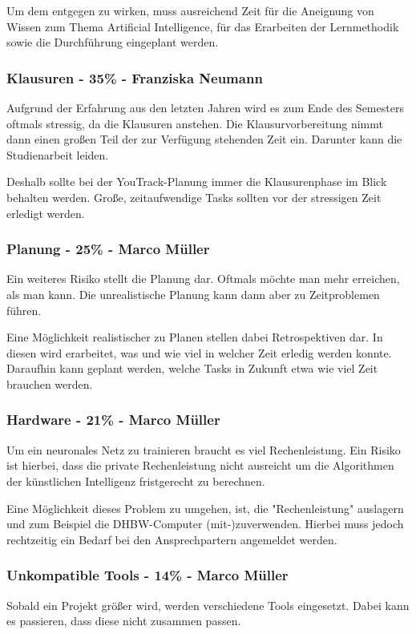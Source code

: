 Um dem entgegen zu wirken, muss ausreichend Zeit für die Aneignung von Wissen zum Thema Artificial Intelligence, für das Erarbeiten der Lernmethodik sowie die Durchführung eingeplant werden.

\subsubsection{Klausuren - 35\% - Franziska Neumann}
Aufgrund der Erfahrung aus den letzten Jahren wird es zum Ende des Semesters oftmals stressig, da die Klausuren anstehen. Die Klausurvorbereitung nimmt dann einen großen Teil der zur Verfügung stehenden Zeit ein. Darunter kann die Studienarbeit leiden.

Deshalb sollte bei der YouTrack-Planung immer die Klausurenphase im Blick behalten werden. Große, zeitaufwendige Tasks sollten vor der stressigen Zeit erledigt werden.

\subsubsection{Planung - 25\% - Marco Müller}
Ein weiteres Risiko stellt die Planung dar. Oftmals möchte man mehr erreichen, als man kann. Die unrealistische Planung kann dann aber zu Zeitproblemen führen. 

Eine Möglichkeit realistischer zu Planen stellen dabei Retrospektiven dar. In diesen wird erarbeitet, was und wie viel in welcher Zeit erledig werden konnte. Daraufhin kann geplant werden, welche Tasks in Zukunft etwa wie viel Zeit brauchen werden.

\subsubsection{Hardware - 21\% - Marco Müller}
Um ein neuronales Netz zu trainieren braucht es viel Rechenleistung. Ein Risiko ist hierbei, dass die private Rechenleistung nicht ausreicht um die Algorithmen der künstlichen Intelligenz fristgerecht zu berechnen. 

Eine Möglichkeit dieses Problem zu umgehen, ist, die "Rechenleistung" auslagern und zum Beispiel die DHBW-Computer (mit-)zuverwenden. Hierbei muss jedoch rechtzeitig ein Bedarf bei den Ansprechpartern angemeldet werden.

\subsubsection{Unkompatible Tools - 14\% - Marco Müller}
Sobald ein Projekt größer wird, werden verschiedene Tools eingesetzt. Dabei kann es passieren, dass diese nicht zusammen passen. 

